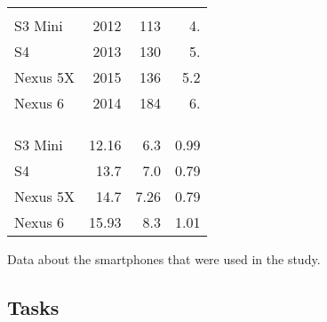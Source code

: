\begin{margintable}
	\vspace{-10cm}
	\centering
	\begin{tabularx}{1.03\marginparwidth}{Xd{2.1}d{2.1}d{1.1}}
		\toprule
		&
		&    
		 &
		 \\
		\\
		\\
		\midrule
		S3 Mini  		& 2012 & 113 &  4. \\
		S4 				& 2013 & 130 &5.   \\
		Nexus 5X 		& 2015 & 136 &5.2  \\
		Nexus 6 		& 2014 & 184 & 6.  \\ 
		
		
		\bottomrule
		
		& &
		 &
		 \\ 
		\\
		\\
		\midrule
		S3 Mini  		& 12.16 & 6.3  & 0.99 \\
		S4 				& 13.7  & 7.0  & 0.79 \\
		Nexus 5X 		& 14.7  & 7.26 & 0.79 \\
		Nexus 6 		& 15.93 & 8.3  & 1.01 \\
		
		\bottomrule
	\end{tabularx}%
	\caption[Smartphone data]{\small Data about the smartphones that were used in the study.}
	\label{tab:devices}
\end{margintable}

\subsection{Tasks}
\label{sec:tasks}

